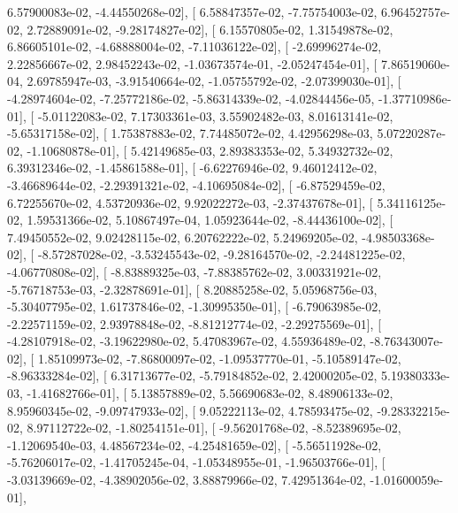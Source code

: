 \documentclass{article}
\begin{document}
          6.57900083e-02,  -4.44550268e-02],
       [  6.58847357e-02,  -7.75754003e-02,   6.96452757e-02,
          2.72889091e-02,  -9.28174827e-02],
       [  6.15570805e-02,   1.31549878e-02,   6.86605101e-02,
         -4.68888004e-02,  -7.11036122e-02],
       [ -2.69996274e-02,   2.22856667e-02,   2.98452243e-02,
         -1.03673574e-01,  -2.05247454e-01],
       [  7.86519060e-04,   2.69785947e-03,  -3.91540664e-02,
         -1.05755792e-02,  -2.07399030e-01],
       [ -4.28974604e-02,  -7.25772186e-02,  -5.86314339e-02,
         -4.02844456e-05,  -1.37710986e-01],
       [ -5.01122083e-02,   7.17303361e-03,   3.55902482e-03,
          8.01613141e-02,  -5.65317158e-02],
       [  1.75387883e-02,   7.74485072e-02,   4.42956298e-03,
          5.07220287e-02,  -1.10680878e-01],
       [  5.42149685e-03,   2.89383353e-02,   5.34932732e-02,
          6.39312346e-02,  -1.45861588e-01],
       [ -6.62276946e-02,   9.46012412e-02,  -3.46689644e-02,
         -2.29391321e-02,  -4.10695084e-02],
       [ -6.87529459e-02,   6.72255670e-02,   4.53720936e-02,
          9.92022272e-03,  -2.37437678e-01],
       [  5.34116125e-02,   1.59531366e-02,   5.10867497e-04,
          1.05923644e-02,  -8.44436100e-02],
       [  7.49450552e-02,   9.02428115e-02,   6.20762222e-02,
          5.24969205e-02,  -4.98503368e-02],
       [ -8.57287028e-02,  -3.53245543e-02,  -9.28164570e-02,
         -2.24481225e-02,  -4.06770808e-02],
       [ -8.83889325e-03,  -7.88385762e-02,   3.00331921e-02,
         -5.76718753e-03,  -2.32878691e-01],
       [  8.20885258e-02,   5.05968756e-03,  -5.30407795e-02,
          1.61737846e-02,  -1.30995350e-01],
       [ -6.79063985e-02,  -2.22571159e-02,   2.93978848e-02,
         -8.81212774e-02,  -2.29275569e-01],
       [ -4.28107918e-02,  -3.19622980e-02,   5.47083967e-02,
          4.55936489e-02,  -8.76343007e-02],
       [  1.85109973e-02,  -7.86800097e-02,  -1.09537770e-01,
         -5.10589147e-02,  -8.96333284e-02],
       [  6.31713677e-02,  -5.79184852e-02,   2.42000205e-02,
          5.19380333e-03,  -1.41682766e-01],
       [  5.13857889e-02,   5.56690683e-02,   8.48906133e-02,
          8.95960345e-02,  -9.09747933e-02],
       [  9.05222113e-02,   4.78593475e-02,  -9.28332215e-02,
          8.97112722e-02,  -1.80254151e-01],
       [ -9.56201768e-02,  -8.52389695e-02,  -1.12069540e-03,
          4.48567234e-02,  -4.25481659e-02],
       [ -5.56511928e-02,  -5.76206017e-02,  -1.41705245e-04,
         -1.05348955e-01,  -1.96503766e-01],
       [ -3.03139669e-02,  -4.38902056e-02,   3.88879966e-02,
          7.42951364e-02,  -1.01600059e-01],
\end{document}
